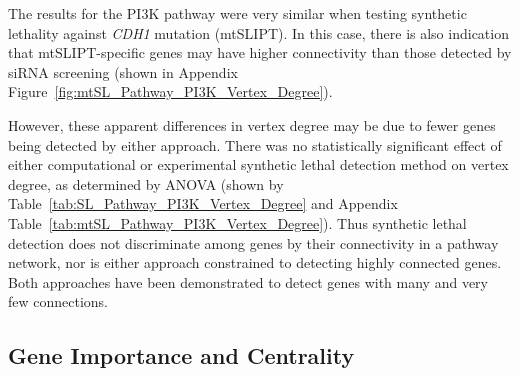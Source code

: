 \begin{table*}[!htb]
\caption{\Gls{ANOVA} for Synthetic Lethality and Vertex Degree}
\label{tab:SL_Pathway_PI3K_Vertex_Degree}
\noindent{}
\end{table*} \filbreak

The results for the PI3K pathway were very similar when testing synthetic lethality against \textit{CDH1} mutation (mtSLIPT). In this case, there is also indication that mtSLIPT-specific genes may have higher connectivity than those detected by \gls{siRNA} screening (shown in Appendix Figure~\ref{fig:mtSL_Pathway_PI3K_Vertex_Degree}).

However, these apparent differences in vertex degree may be due to fewer genes being detected by either approach. There was no statistically significant effect of either computational or experimental synthetic lethal detection method on vertex degree, as determined by \gls{ANOVA} (shown by Table~\ref{tab:SL_Pathway_PI3K_Vertex_Degree} and Appendix Table~\ref{tab:mtSL_Pathway_PI3K_Vertex_Degree}). Thus synthetic lethal detection does not discriminate among genes by their connectivity in a pathway network, nor is either approach constrained to detecting highly connected genes. Both approaches have been demonstrated to detect genes with many and very few connections.

\FloatBarrier

\subsection{Gene Importance and Centrality}  \label{chapt4:Network_Centrality}

